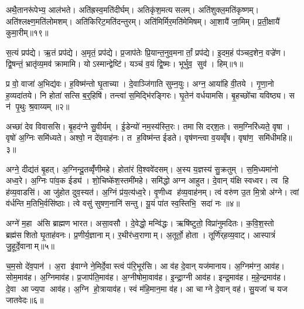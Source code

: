 अथै॒तानरू॑पेभ्य॒ आल॑भते। अति॑ह्रस्व॒मति॑दीर्घम्। अतिकृ॑श॒मत्यसलम्। अति॑शुक्ल॒मति॑कृष्णम्। अति॑श्लक्ष्ण॒मति॑लोमशम्। अति॑किरिट॒मति॑दन्तुरम्। अति॑मिर्मिर॒मति॑मेमिषम्। आ॒शायै॑ जा॒मिम्। प्र॒ती॒क्षायै॑ कुमा॒रीम्॥१९॥



\clearpage
{}
\setcounter{anuvakam}{0}
स॒त्यं प्रप॑द्ये। ऋ॒तं प्रप॑द्ये। अ॒मृतं॒ प्रप॑द्ये। प्र॒जाप॑तेः प्रि॒यान्त॒नुव॒मनार्तां॒ प्रप॑द्ये। इ॒दम॒हं प॑ञ्चद॒शेन॒ वज्रे॑ण। द्वि॒षन्तं॒ भ्रातृ॑व्य॒मव॑ क्रामामि। योऽस्मान्द्वेष्टि॑। यञ्च॑ व॒यं द्वि॒ष्मः। भूर्भुव॒ सुव॑। हिम्॥१॥\anuvakamend[स॒त्यन्दश॑]

प्र वो॒ वाजा॑ अ॒भिद्य॑वः। ह॒विष्म॑न्तो घृ॒ताच्या। दे॒वाञ्जि॑गाति सुम्न॒युः। अग्न॒ आया॑हि वी॒तये। गृ॒णा॒नो ह॒व्यदा॑तये। नि होता॑ सत्सि ब॒र्॒हिषि॑। तन्त्वा॑ स॒मिद्भि॑रङ्गिरः। घृ॒तेन॑ वर्धयामसि। बृ॒हच्छो॑चा यविष्ठ्य। स न॑ पृ॒थुः श्र॒वाय्यम्॥२॥

अच्छा॑ देव विवाससि। बृ॒हद॑ग्ने सु॒वीर्यम्। ई॒डेन्यो॑ नम॒स्य॑स्ति॒रः। तमासि दर्‌श॒तः। सम॒ग्निरि॑ध्यते॒ वृषा। वृषो॑ अ॒ग्निः समि॑ध्यते। अश्वो॒ न दे॑व॒वाह॑नः। त ह॒विष्म॑न्त ईडते। वृष॑णन्त्वा व॒यव्वृँष\sn{}। वृषा॑ण॒ समि॑धीमहि॥३॥

अग्ने॒ दीद्य॑तं बृ॒हत्। अ॒ग्निन्दू॒तव्वृँ॑णीमहे। होता॑रं वि॒श्ववे॑दसम्। अ॒स्य य॒ज्ञस्य॑ सु॒क्रतुम्। स॒मि॒ध्यमा॑नो अध्व॒रे। अ॒ग्निः पा॑व॒क ईड्य॑। शो॒चिष्के॑श॒स्तमी॑महे। समि॑द्धो अग्न आहुत। दे॒वान् य॑क्षि स्वध्वर। त्व हि ह॑व्य॒वाडसि॑। आ जु॑होत दुव॒स्यत॑। अ॒ग्निं प्र॑य॒त्य॑ध्व॒रे। वृ॒णीध्व ह॑व्य॒वाह॑नम्। त्वं वरु॑ण उ॒त मि॒त्रो अ॑ग्ने। त्वां व॑र्धन्ति म॒तिभि॒र्वसि॑ष्ठाः। त्वे वसु॑ सुषण॒नानि॑ सन्तु। यू॒यं पा॑त स्व॒स्तिभि॒ सदा॑ नः ॥४॥\anuvakamend[श्र॒वाय्य॑मिधीम॒ह्यसि॑ स॒प्त च॑]

अग्ने॑ म॒हा अ॑सि ब्राह्मण भारत। असा॒वसौ। दे॒वेद्धो॒ मन्वि॑द्धः। ऋषि॑ष्टुतो॒ विप्रा॑नुमदितः। क॒वि॒श॒स्तो ब्रह्म॑सशितो घृ॒ताह॑वनः। प्र॒णीर्य॒ज्ञानाम्। र॒थीर॑ध्व॒राणाम्। अ॒तूर्तो॒ होता। तूर्णि॑र्‌हव्य॒वाट्। आस्पात्रं॑ जु॒हूर्दे॒वानाम्॥५॥

च॒म॒सो दे॑व॒पान॑। अ॒रा इ॑वाग्ने ने॒मिर्दे॒वास्त्वं प॑रि॒भूर॑सि। आ व॑ह दे॒वान् यज॑मानाय। अ॒ग्निम॑ग्न॒ आव॑ह। सोम॒माव॑ह। अ॒ग्निमाव॑ह। प्र॒जाप॑ति॒माव॑ह। अ॒ग्नीषोमा॒वाव॑ह। इ॒न्द्रा॒ग्नी आव॑ह। इन्द्र॒माव॑ह। म॒हे॒न्द्रमाव॑ह। दे॒वा आज्य॒पा आव॑ह। अ॒ग्नि हो॒त्रायाव॑ह। स्वं म॑हि॒मान॒मा व॑ह। आ चाग्ने दे॒वान् वह॑। सु॒यजा॑ च यज जातवेदः॥६॥\anuvakamend[दे॒वाना॒मिन्द्र॒मा व॑ह॒ षट् च॑]

